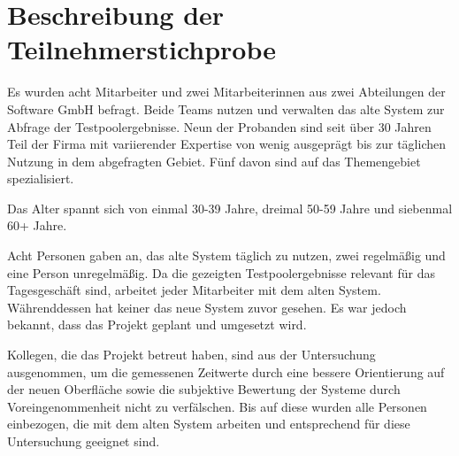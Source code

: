 \section{Beschreibung der Teilnehmerstichprobe}
\label{ch:Validierung:sec:Stichprobe}

Es wurden acht Mitarbeiter und zwei Mitarbeiterinnen aus zwei Abteilungen der Software GmbH befragt. Beide Teams nutzen und verwalten das alte System zur Abfrage der Testpoolergebnisse. Neun der Probanden sind seit über 30 Jahren Teil der Firma mit variierender Expertise von wenig ausgeprägt bis zur täglichen Nutzung in dem abgefragten Gebiet. Fünf davon sind auf das Themengebiet spezialisiert.

Das Alter spannt sich von einmal 30-39 Jahre, dreimal 50-59 Jahre und siebenmal 60+ Jahre.

Acht Personen gaben an, das alte System täglich zu nutzen, zwei regelmäßig und eine Person unregelmäßig. Da die gezeigten Testpoolergebnisse relevant für das Tagesgeschäft sind, arbeitet jeder Mitarbeiter mit dem alten System. Währenddessen hat keiner das neue System zuvor gesehen. Es war jedoch bekannt, dass das Projekt geplant und umgesetzt wird.

Kollegen, die das Projekt betreut haben, sind aus der Untersuchung ausgenommen, um die gemessenen Zeitwerte durch eine bessere Orientierung auf der neuen Oberfläche sowie die subjektive Bewertung der Systeme durch Voreingenommenheit nicht zu verfälschen. Bis auf diese wurden alle Personen einbezogen, die mit dem alten System arbeiten und entsprechend für diese Untersuchung geeignet sind.

